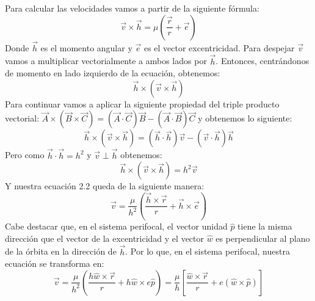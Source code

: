 \documentclass{article}
\numberwithin{equation}{section}
\begin{document}
Para calcular las velocidades vamos a partir de la siguiente 
fórmula: 
\begin{equation}
    \overrightarrow{v}\times \overrightarrow{h}=\mu\left(\frac{\overrightarrow{r}}{r}+\overrightarrow{e}\right) 
\end{equation}
Donde $\overrightarrow{h}$ es el momento angular y 
$\overrightarrow{e}$ es el vector excentricidad. Para despejar 
$\overrightarrow{v}$ vamos a multiplicar vectorialmente a ambos 
lados por $\overrightarrow{h}$. Entonces, centrándonos de momento 
en lado izquierdo de la ecuación, obtenemos: 
\begin{equation*}
    \overrightarrow{h}\times(\overrightarrow{v}\times\overrightarrow{h})
\end{equation*}
Para continuar vamos a aplicar la siguiente propiedad del 
triple producto vectorial: $\overrightarrow{A}\times(\overrightarrow{B}\times\overrightarrow{C})
=(\overrightarrow{A}\cdot\overrightarrow{C})\overrightarrow{B}-(\overrightarrow{A}\cdot\overrightarrow{B})\overrightarrow{C}$
y obtenemos lo siguiente: 
\begin{equation*}
    \overrightarrow{h}\times(\overrightarrow{v}\times\overrightarrow{h})=(\overrightarrow{h}\cdot\overrightarrow{h})\overrightarrow{v}-(\overrightarrow{v}\cdot\overrightarrow{h})\overrightarrow{h}
\end{equation*}
Pero como $\overrightarrow{h}\cdot\overrightarrow{h}=h^{2}$ y 
$\overrightarrow{v}\perp\overrightarrow{h}$ obtenemos: 
\begin{equation*}
    \overrightarrow{h}\times(\overrightarrow{v}\times\overrightarrow{h})=h^{2}\overrightarrow{v}
\end{equation*}
Y nuestra ecuación 2.2 queda de la siguiente manera:
\begin{equation}
    \overrightarrow{v}=\frac{\mu}{h^{2}}\left(\frac{\overrightarrow{h}\times\overrightarrow{r}}{r}+\overrightarrow{h}\times\overrightarrow{e}\right)
\end{equation}
Cabe destacar que, en el sistema perifocal, el vector unidad 
$\hat{p}$ tiene la misma dirección que el vector 
de la excentricidad y el vector $\hat{w}$ es perpendicular 
al plano de la órbita en la dirección de $\overrightarrow{h}$. Por 
lo que, en el sistema perifocal, nuestra ecuación se transforma en: 
\begin{equation}
    \overrightarrow{v}=\frac{\mu}{h^{2}}\left(\frac{h\hat{w}\times\overrightarrow{r}}{r}+h\hat{w}\times e\hat{p}\right)=\frac{\mu}{h}\left[\frac{\hat{w}\times\overrightarrow{r}}{r}+e(\hat{w}\times\hat{p})\right]
\end{equation}
\end{document}
